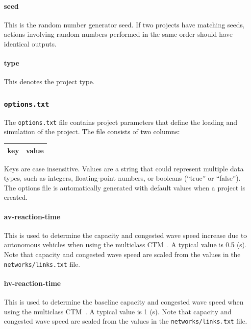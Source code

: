 \paragraph*{seed}
This is the random number generator seed. If two projects have matching seeds, actions involving random numbers performed in the same order should have identical outputs.

\paragraph*{type}
This denotes the project type.


\subsubsection{\texttt{options.txt}}
\label{sec:options}

The \texttt{options.txt} file contains project parameters that define the loading and simulation of the project. The file consists of two columns:
\begin{center}
\begin{tabular}{cc}
\hline
key & value\\\hline
\end{tabular}
\end{center}
Keys are case insensitive. Values are a string that could represent multiple data types, such as integers, floating-point numbers, or booleans (``true'' or ``false''). The options file is automatically generated with default values when a project is created. 

\paragraph*{av-reaction-time}
This is used to determine the capacity and congested wave speed increase due to autonomous vehicles when using the multiclass CTM~\cite{levin2016multiclass}. A typical value is 0.5 (s). Note that capacity and congested wave speed are scaled from the values in the \texttt{networks/links.txt} file.

\paragraph*{hv-reaction-time}
This is used to determine the baseline capacity and congested wave speed when using the multiclass CTM~\cite{levin2016multiclass}. A typical value is 1 (s). Note that capacity and congested wave speed are scaled from the values in the \texttt{networks/links.txt} file.

